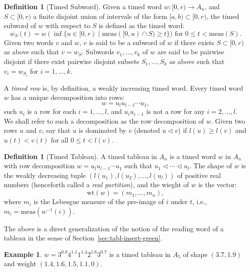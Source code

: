 \documentclass[12pt]{amsart}
\theoremstyle{definition}
\newtheorem{definition}[theorem]{Definition}
\newtheorem{example}[theorem]{Example}
\newcommand{\wt}{\mathrm{wt}}
\begin{document}
\begin{definition}
  [Timed Subword]
  \label{definition:timed-subword}
  Given a timed word $w:[0,r)\to A_n$, and $S\subset [0,r)$ a finite disjoint union of intervals of the form $[a, b)\subset [0,r)$, the timed subword of $w$ with respect to $S$ is defined as the timed word:
  \begin{displaymath}
    w_S(t) = w(\inf\{u\in [0,r)\mid \mathrm{meas}([0,u)\cap S) \geq t\}) \text{ for } 0\leq t < \mathrm{meas}(S).
  \end{displaymath}
  Given two words $v$ and $w$, $v$ is said to be a subword of $w$ if there exists $S\subset [0,r)$ as above such that $v=w_S$.
  Subwords $v_1,\dotsc,v_k$ of $w$ are said to be pairwise disjoint if there exist pairwise disjoint subsets $S_1,\dotsc,S_k$ as above such that $v_i=w_{S_i}$ for $i=1,\dotsc,k$.
\end{definition}

A \emph{timed row} is, by definition, a weakly increasing timed word.
Every timed word $w$ has a unique decomposition into rows:
\begin{displaymath}
  w = u_l u_{l-1}\dotsb u_1,
\end{displaymath}
such $u_i$ is a row for each $i=1,\dotsc,l$, and $u_iu_{i-1}$ is not a row for any $i=2,\dotsc,l$.
We shall refer to such a decomposition as the row decomposition of $w$.
Given two rows $u$ and $v$, say that $u$ is dominated by $v$ (denoted $u\lhd v$) if $l(u)\geq l(v)$ and $u(t)<v(t)$ for all $0\leq t<l(v)$.
\begin{definition}[Timed Tableau]\label{definition:timed-tableau}
  A timed tableau in $A_n$ is a timed word $w$ in $A_n$ with row decomposition $w=u_l u_{l-1}\dotsb u_1$ such that $u_1\lhd \dotsb \lhd u_l$.
  The shape of $w$ is the weakly decreasing tuple $(l(u_1),l(u_2),\dotsc,l(u_l))$ of positive real numbers (henceforth called a \emph{real partition}), and the wieght of $w$ is the vector:
  \begin{displaymath}
    \wt(w) = (m_1,\dotsc,m_n),
  \end{displaymath}
where $m_i$ is the Lebesgue measure of the pre-image of $i$ under $t$, i.e., $m_i=\mathrm{meas}(w^{-1}(i))$.
\end{definition}
The above is a direct generalization of the notion of the reading word of a tableau in the sense of Section~\ref{sec:tabl-insert-green}.
\begin{example}
  \label{example:timed-tableau}
  $w=3^{0.8}4^{1.1}1^{1.4}2^{1.6}3^{0.7}$ is a timed tableau in $A_5$ of shape $(3.7,1.9)$ and weight $(1.4, 1.6, 1.5, 1.1,0)$.
\end{example}
\end{document}
